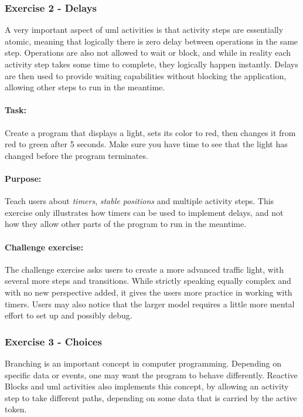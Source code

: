 \subsubsection{Exercise 2 - Delays}
A very important aspect of \gls{uml} activities is that activity steps are essentially atomic, meaning that logically there is zero delay between operations in the same step. Operations are also not allowed to wait or block, and while in reality each activity step takes some time to complete, they logically happen instantly. Delays are then used to provide waiting capabilities without blocking the application, allowing other steps to run in the meantime.

\paragraph{Task:} Create a program that displays a light, sets its color to red, then changes it from red to green after 5 seconds. Make sure you have time to see that the light has changed before the program terminates.

\paragraph{Purpose:} Teach users about \emph{timers}, \emph{stable positions} and multiple activity steps. This exercise only illustrates how timers can be used to implement delays, and not how they allow other parts of the program to run in the meantime.

\paragraph{Challenge exercise:} The challenge exercise asks users to create a more advanced traffic light, with several more steps and transitions. While strictly speaking equally complex and with no new perspective added, it gives the users more practice in working with timers. Users may also notice that the larger model requires a little more mental effort to set up and possibly debug.

\subsubsection{Exercise 3 - Choices}
Branching is an important concept in computer programming. Depending on specific data or events, one may want the program to behave differently. Reactive Blocks and \gls{uml} activities also implements this concept, by allowing an activity step to take different paths, depending on some data that is carried by the active token.

